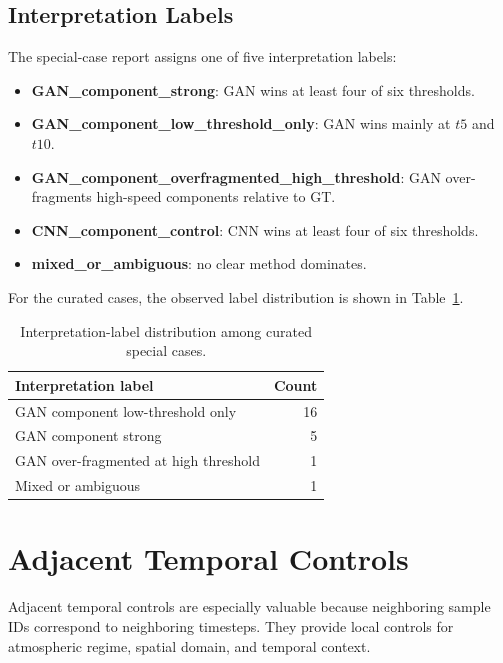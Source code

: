 \documentclass[conference]{IEEEtran}
\begin{document}
\subsection{Interpretation Labels}

The special-case report assigns one of five interpretation labels:
\begin{itemize}
    \item \textbf{GAN\_component\_strong}: GAN wins at least four of six thresholds.
    \item \textbf{GAN\_component\_low\_threshold\_only}: GAN wins mainly at $t5$ and $t10$.
    \item \textbf{GAN\_component\_overfragmented\_high\_threshold}: GAN over-fragments high-speed components relative to GT.
    \item \textbf{CNN\_component\_control}: CNN wins at least four of six thresholds.
    \item \textbf{mixed\_or\_ambiguous}: no clear method dominates.
\end{itemize}

For the curated cases, the observed label distribution is shown in Table~\ref{tab:curated_label_distribution}.

\begin{table}[t]
\centering
\caption{Interpretation-label distribution among curated special cases.}
\label{tab:curated_label_distribution}
\begin{tabular}{lr}
\toprule
Interpretation label & Count \\
\midrule
GAN component low-threshold only & 16 \\
GAN component strong & 5 \\
GAN over-fragmented at high threshold & 1 \\
Mixed or ambiguous & 1 \\
\bottomrule
\end{tabular}
\end{table}

\section{Adjacent Temporal Controls}

Adjacent temporal controls are especially valuable because neighboring sample IDs correspond to neighboring timesteps. They provide local controls for atmospheric regime, spatial domain, and temporal context.
\end{document}

